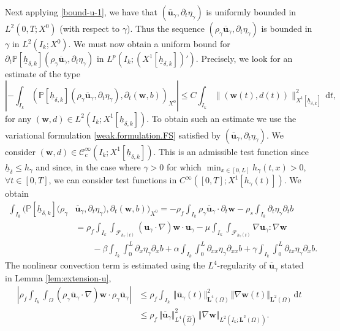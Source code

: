 \documentclass[JEP,XML,SOM,Unicode,NoFloatCountersInSection]{cedram}
\let\mathcal\mathscr
\theoremstyle{remark}
\theoremstyle{definition}
\newcommand{\norme}[1]{\,\Vert #1\Vert}
\newcommand{\ug}{\boldsymbol{u}}
\newcommand{\dd}{\,\mathrm{d}}
\newcommand{\wg}{\boldsymbol{w}}
\newcommand{\BS}[1]{\boldsymbol{#1}}
\let\CM\Omega
\newcommand{\CMT}{\widehat{\Omega}}
\newcommand{\hb}{{\underline{h}}}
\begin{document}
Next applying \eqref{bound-u-1}, we have that $(\overline{\ug}_{\gamma},\partial_{t}\eta_{\gamma})$ is uniformly bounded in $L^{2}(0,T;X^0)$ (with respect to $\gamma$). Thus the sequence $(\rho_{\gamma}\overline{\ug}_{\gamma},\partial_{t}\eta_{\gamma})$ is bounded in $\gamma$ in $L^{2}(I_{k};X^0)$. We must now obtain a uniform bound for
$\partial_{t}\mathbb{P}[\hb_{\delta, k}](\rho_{\gamma}\overline{\ug}_{\gamma},\partial_{t}\eta_{\gamma})$ in $L^p(I_k; (X^1[\hb_{\delta,k}])')$. Precisely, we look for an estimate of the type
\[
\left| -\int_{I_{k}}\left( \mathbb{P}[\hb_{\delta, k}](\rho_{\gamma}\overline{\ug}_{\gamma},\partial_{t}\eta_{\gamma}), \partial_{t}(\wg,b) \right)_{X^0}
\right| \leq C \int_{I_k} \|(\wg(t),d(t))\|_{X^1[\hb_{\delta,k}]}^{2}
\dd t,
\]
for any $(\wg,d) \in L^2(I_k; X^1[\hb_{\delta,k}])$.
To obtain such an estimate we use the variational formulation \eqref{weak.formulation.FS} satisfied by $(\overline{\ug}_{\gamma},\partial_{t}\eta_{\gamma})$. We consider
$(\wg,d) \in \mathcal C^{\infty}_c(I_k; X^1[\hb_{\delta,k}])$. This is an admissible test function since $\hb_{\delta}\leq h_\gamma$ and since, in the case where \hbox{$\gamma>0$} for which $\min_{x\in [0, L]}h_\gamma(t, x)>0$, $\forall t\in [0, T]$, we can consider test functions in $C^{\infty}([0, T]; X^1[h_\gamma(t)])$.
We obtain
\begin{align*}
\int_{I_{k}}\bigl( \mathbb{P}[\hb_{\delta, k}](\rho_{\gamma}&\overline{\ug}_{\gamma},\partial_{t}\eta_{\gamma}), \partial_{t}(\wg,b) \bigr)_{X^0}=-\rho_{f}\int_{I_{k}}\rho_{\gamma}\overline{\ug}_{\gamma}\cdot\partial_{t}\wg - \rho_{s}\int_{I_{k}}\partial_{t}\eta_{\gamma}\partial_{t}b\\
&=\rho_{f}\int_{I_{k}}\int_{\mathcal{F}_{h_\gamma(t)}}({\ug}_{\gamma}\cdot\nabla)\wg\cdot{\ug}_{\gamma}-\mu\int_{I_{k}}\int_{\mathcal{F}_{h_\gamma(t)}}\nabla{\ug_\gamma}:\nabla \wg\\
& \qquad -\beta\int_{I_{k}}\int_{0}^{L}\partial_{x}\eta_{\gamma}\partial_{x}b+ \alpha\int_{I_{k}}\int_{0}^{L}\partial_{xx}\eta_{\gamma}\partial_{xx}b +\gamma\int_{I_{k}}\int_{0}^{L}\partial_{tx}\eta_{\gamma}\partial_{x}b.
\end{align*}
The nonlinear convection term is estimated using the $L^{4}$-regularity of $\overline{\ug}_{\gamma}$ stated in Lemma \ref{lem:extension-u},
\[\begin{aligned}
\left\vert\rho_{f} \int_{I_{k}}\int_{\CM}(\rho_{\gamma}\overline{\ug}_{\gamma}\cdot\nabla)\wg\cdot\rho_{\gamma}\overline{\ug}_{\gamma}\right\vert&{}\leq \rho_{f}\int_{I_{k}}\norme{\overline{\ug}_{\gamma}(t)}_{\BS{L}^{4}(\CM)}^{2}\norme{\nabla\wg(t)}_{\BS{L}^{2}(\CM)}\dd t\\
&\leq \rho_{f}\norme{\overline{\ug}_{\gamma}}_{L^{4}(\CMT)}^{2}\norme{\nabla\wg}_{L^{2}(I_{k};\BS{L}^{2}(\CM))}.
\end{aligned}
\]
\end{document}
